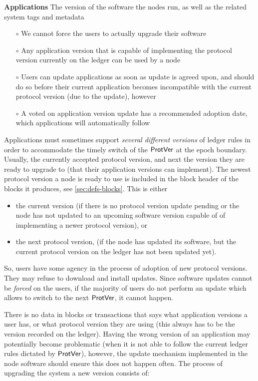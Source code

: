 \textbf{Applications} The version of the software the nodes run,
as well as the related system tags and metadata
\begin{itemize}
\item[$\circ$] We cannot force the users to actually upgrade their software
\item[$\circ$] Any application version that is capable of implementing the protocol version
currently on the ledger can be used by a node
\item[$\circ$] Users can update applications as soon as update is agreed upon, and should
do so before their current application becomes incompatible with the
current protocol version (due to the update), however
\item[$\circ$] A voted on application version update has a recommended adoption date,
which applications will automatically follow
\end{itemize}

Applications must sometimes support \textit{several different versions}
of ledger rules in order to accommodate the timely switch of the $\mathsf{ProtVer}$ at the
epoch boundary. Usually, the currently accepted protocol version, and next the
version they are ready to upgrade to (that their application versions can
implement).
The newest protocol version a node is ready to use is included in the block
header of the blocks it produces, see \ref{sec:defs-blocks}. This is either

\begin{itemize}
\item the current version (if there is no protocol version update pending or the node
has not updated to an upcoming software version capable of of implementing a
newer protocol version), or
\item the next protocol version,
(if the node has updated its software, but the current protocol version on the
ledger has not been updated yet).
\end{itemize}

So, users have some agency in the process of adoption of
new protocol versions. They may refuse to download and install updates.
Since software updates cannot be \textit{forced} on the users, if the majority of
users do not perform an update which allows to switch to the next $\mathsf{ProtVer}$,
it cannot happen.

There is no data in blocks or transactions that says what application
versions a user has, or what protocol version they are using (this always has to
be the version recorded on the ledger).
Having the wrong version of an application
may potentially become problematic (when it is not able to follow the current
ledger rules dictated by $\mathsf{ProtVer}$), however, the update mechanism implemented
in the node software should
ensure this does not happen often.
The process of upgrading the system a new version consists of:

